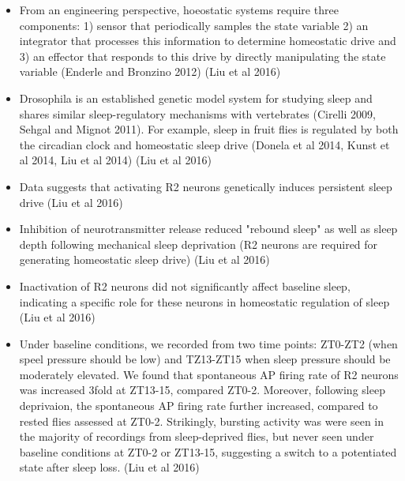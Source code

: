 \documentclass[11pt]{article}
\begin{document}
\begin{itemize}
    \item From an engineering perspective, hoeostatic systems require three components: 1) sensor that periodically samples
    the state variable 2) an integrator that processes this information to determine homeostatic drive and 3) an
    effector that responds to this drive by directly manipulating the state variable (Enderle and Bronzino 2012) \parencite{liuSleepDriveEncoded2016}
    (Liu et al 2016)

    \item Drosophila is an established genetic model system for studying sleep and shares similar sleep-regulatory
    mechanisms with vertebrates (Cirelli 2009, Sehgal and Mignot 2011). For example, sleep in fruit flies is regulated by
    both the circadian clock and homeostatic sleep drive (Donela et al 2014, Kunst et al 2014, Liu et al 2014) \parencite{liuSleepDriveEncoded2016}
    (Liu et al 2016)

    \item Data suggests that activating R2 neurons genetically induces persistent sleep drive \parencite{liuSleepDriveEncoded2016}
    (Liu et al 2016)

    \item Inhibition of neurotransmitter release reduced "rebound sleep" as well as sleep depth following mechanical sleep deprivation
    (R2 neurons are required for generating homeostatic sleep drive) \parencite{liuSleepDriveEncoded2016}
    (Liu et al 2016)

    \item Inactivation of R2 neurons did not significantly affect baseline sleep, indicating a specific role for these neurons in
    homeostatic regulation of sleep \parencite{liuSleepDriveEncoded2016}
    (Liu et al 2016)

    \item Under baseline conditions, we recorded from two time points: ZT0-ZT2 (when speel pressure should be low)
    and TZ13-ZT15 when sleep pressure should be moderately elevated. We found that spontaneous AP firing rate of R2
    neurons was increased 3fold at ZT13-15, compared ZT0-2. Moreover, following sleep deprivaion, the spontaneous
    AP firing rate further increased, compared to rested flies assessed at ZT0-2. Strikingly, bursting activity
    was were seen in the majority of recordings from sleep-deprived flies, but never seen under baseline conditions at ZT0-2
    or ZT13-15, suggesting a switch to a potentiated state after sleep loss. \parencite{liuSleepDriveEncoded2016}
    (Liu et al 2016)


\end{itemize}
\end{document}
